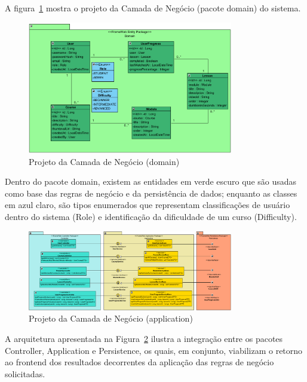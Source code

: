 
A figura~\ref{domain} mostra o projeto da Camada de Negócio (pacote \textsf{domain}) do sistema.

\begin{figure}[h]
	\centering
	\includegraphics[width=0.8\textwidth]{figuras/domain.png}
	\caption{Projeto da Camada de Negócio (\textsf{domain})}
	\label{domain}
\end{figure}

Dentro do pacote \textsf{domain}, existem as entidades em verde escuro que são usadas como base das regras de negócio e da persistência de dados; enquanto as classes em azul claro, são tipos enumerados que representam classificações de usuário dentro do sistema (\textsf{Role}) e identificação da dificuldade de um curso (\textsf{Difficulty}).

\begin{figure}[h]
	\centering
	\includegraphics[width=0.8\textwidth]{figuras/application.png}
	\caption{Projeto da Camada de Negócio (\textsf{application})}
	\label{application}
\end{figure}

A arquitetura apresentada na Figura~\ref{application} ilustra a integração entre os pacotes Controller, Application e Persistence, os quais, em conjunto, viabilizam o retorno ao frontend dos resultados decorrentes da aplicação das regras de negócio solicitadas.

